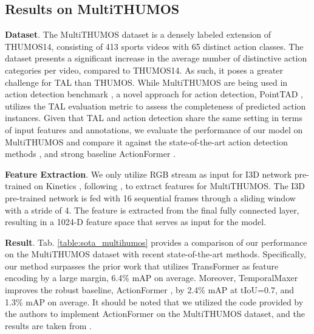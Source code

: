 \documentclass[10pt,twocolumn,letterpaper]{article}
\begin{document}
 

\subsection{Results on MultiTHUMOS}
\textbf{Dataset}. The MultiTHUMOS dataset \cite{yeung2018every} is a densely labeled extension of THUMOS14, consisting of 413 sports videos with 65 distinct action classes. The dataset presents a significant increase in the average number of distinctive action categories per video, compared to THUMOS14. As such, it poses a greater challenge for TAL than THUMOS. While MultiTHUMOS are being used in action detection benchmark \cite{dai2021pdan, dai2022ms}, a novel approach for action detection, PointTAD \cite{tan2022pointtad}, utilizes the TAL evaluation metric to assess the completeness of predicted action instances. Given that TAL and action detection share the same setting in terms of input features and annotations, we evaluate the performance of our model on MultiTHUMOS and compare it against the state-of-the-art action detection methods \cite{dai2021pdan, tirupattur2021modeling, dai2022ms, tan2022pointtad}, and strong baseline ActionFormer \cite{zhang2022actionformer}.



\textbf{Feature Extraction}. We only utilize RGB stream as input for I3D network \cite{carreira2017quo} pre-trained on Kinetics \cite{kay2017kinetics}, following \cite{tan2022pointtad}, to extract features for MultiTHUMOS. The I3D pre-trained network is fed with 16 sequential frames through a sliding window with a stride of 4. The feature is extracted from the final fully connected layer, resulting in a 1024-D feature space that serves as input for the model.

\textbf{Result}. Tab. \ref{table:sota_multihumos} provides a comparison of our performance on the MultiTHUMOS dataset \cite{yeung2018every} with recent state-of-the-art methods. Specifically, our method surpasses the prior work \cite{tan2022pointtad} that utilizes TransFormer as feature encoding by a large margin, 6.4\% mAP on average. Moreover, TemporalMaxer improves the robust baseline, ActionFormer \cite{zhang2022actionformer}, by 2.4\% mAP at tIoU=0.7, and 1.3\% mAP on average. It should be noted that we utilized the code provided by the authors to implement ActionFormer \cite{zhang2022actionformer} on the MultiTHUMOS dataset, and the results \cite{dai2021pdan, tirupattur2021modeling, dai2022ms} are taken from \cite{tan2022pointtad}.
\end{document}
